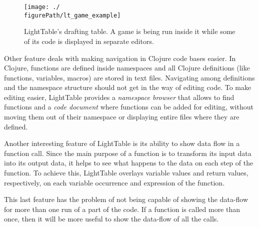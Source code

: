 \begin{figure}
  \centering
  \texttt{[image: ./\\figurePath/lt\_game\_example]}
  \caption[LightTable's drafting table showing a game.]{LightTable's drafting table. A game is being run inside it while some of its code is displayed in separate editors.}
  \label{fig:lt:draft:table}
\end{figure}

Other feature deals with making navigation in Clojure code bases easier.
In Clojure, functions are defined inside namespaces and all Clojure definitions (like functions, variables, macros) are stored in text files.
Navigating among definitions and the namespace structure should not get in the way of editing code.
To make editing easier, LightTable provides a \emph{namespace browser} that allows to find functions and a \emph{code document} where functions can be added for editing, without moving them out of their namespace or displaying entire files where they are defined.


Another interesting feature of LightTable is its ability to show data flow in a function call.
Since the main purpose of a function is to transform its input data into its output data, it helps to see what happens to the data on each step of the function.
To achieve this, LightTable overlays variable values and return values, respectively, on each variable occurrence and expression of the function.

This last feature has the problem of not being capable of showing the data-flow for more than one run of a part of the code.
If a function is called more than once, then it will be more useful to show the data-flow of all the calls.


